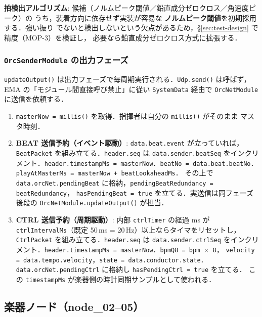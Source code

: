 \documentclass[lualatex,book,paper=a4paper,jafontsize=11.5pt,jafontscale=1.05]{jlreq}
\begin{document}
\textbf{拍検出アルゴリズム}: 候補（ノルムピーク閾値／鉛直成分ゼロクロス／角速度ピーク）の
うち，装着方向に依存せず実装が容易な \textbf{ノルムピーク閾値}を初期採用する．強い振り
でないと検出しないという欠点があるため，\S\ref{sec:test-design} で精度（MOP-3）を検証し，
必要なら鉛直成分ゼロクロス方式に拡張する．

\subsubsection{\texttt{OrcSenderModule} の出力フェーズ}

\texttt{updateOutput()} は出力フェーズで毎周期実行される．\texttt{Udp.send()} は呼ばず，
EMA の「モジュール間直接呼び禁止」に従い \texttt{SystemData} 経由で
\texttt{OrcNetModule} に送信を依頼する．

\begin{enumerate}
  \item \texttt{masterNow = millis()} を取得．指揮者は自分の \texttt{millis()} がそのまま
        マスタ時刻．
  \item \textbf{BEAT 送信予約（イベント駆動）}: \texttt{data.beat.event} が立っていれば，
        \texttt{BeatPacket} を組み立てる．\texttt{header.seq} は \texttt{data.sender.beatSeq}
        をインクリメント．\texttt{header.timestampMs = masterNow}．\texttt{beatNo = data.beat.beatNo}．
        \texttt{playAtMasterMs = masterNow + beatLookaheadMs}．
        その上で \texttt{data.orcNet.pendingBeat} に格納，\texttt{pendingBeatRedundancy = beatRedundancy}，
        \texttt{hasPendingBeat = true} を立てる．実送信は同フェーズ後段の
        \texttt{OrcNetModule.updateOutput()} が担当．
  \item \textbf{CTRL 送信予約（周期駆動）}: 内部 \texttt{ctrlTimer} の経過 ms が
        \texttt{ctrlIntervalMs}（既定 50\,ms = 20\,Hz）以上ならタイマをリセットし，
        \texttt{CtrlPacket} を組み立てる．\texttt{header.seq} は \texttt{data.sender.ctrlSeq}
        をインクリメント．\texttt{header.timestampMs = masterNow}．\texttt{bpmQ8 = bpm $\times$ 8}，
        \texttt{velocity = data.tempo.velocity}，\texttt{state = data.conductor.state}．
        \texttt{data.orcNet.pendingCtrl} に格納し \texttt{hasPendingCtrl = true} を立てる．
        この \texttt{timestampMs} が楽器側の時計同期サンプルとして使われる．
\end{enumerate}


\subsection{楽器ノード（node\_02--05）}\label{sec:proc-flow-performer}
\end{document}
